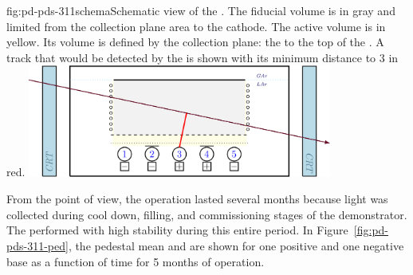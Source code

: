 \begin{dunefigure}{fig:pd-pds-311schema}{Schematic view of the . 
The fiducial volume is in gray and limited from the collection plane area to the cathode. The active volume is in yellow. Its volume is defined by the collection plane: the  to the top of the . A track that would be detected by the  is shown with its minimum distance to  \num{3} in red.}
\includegraphics[width=0.75\textwidth]{graphics/dppd_7_2_v2}
\end{dunefigure}

From the  point of view, the  operation lasted several months because light was collected during cool down, filling, and commissioning stages of the demonstrator.
The  performed with high stability during this entire period. 
In Figure~\ref{fig:pd-pds-311-ped}, the  pedestal mean and  are shown for one positive and one negative base  as a function of time for \num{5} months of operation. 

